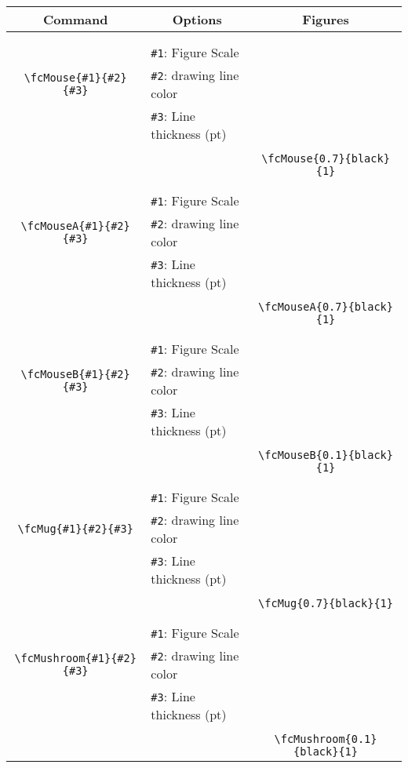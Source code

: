 \documentclass[x11names]{article}
\begin{document}
\begin{table}[H]\centering\begin{tabular}{|c|l|c|}\hline {\bf Command}& \multicolumn{1}{c|}{{\bf Options}} & {\bf Figures}\\  \hline	&&\multirow{5}{*}{\fcMouse{0.7}{black}{1}}\\	&&\\	&\verb|#1|: Figure Scale &\\	\verb|\fcMouse{#1}{#2}{#3}|&	\verb|#2|: drawing line color &\\	&\verb|#3|: Line thickness (pt) &\\ &&\\&&	\verb|\fcMouse{0.7}{black}{1}|\\\hline 	
	&&\multirow{5}{*}{\fcMouseA{0.7}{black}{1}}\\	&&\\	&\verb|#1|: Figure Scale &\\	\verb|\fcMouseA{#1}{#2}{#3}|&	\verb|#2|: drawing line color &\\	&\verb|#3|: Line thickness (pt) &\\ &&\\&&	\verb|\fcMouseA{0.7}{black}{1}|\\\hline 	
	&&\multirow{5}{*}{\fcMouseB{0.1}{black}{1}}\\	&&\\	&\verb|#1|: Figure Scale &\\	\verb|\fcMouseB{#1}{#2}{#3}|&	\verb|#2|: drawing line color &\\	&\verb|#3|: Line thickness (pt) &\\ &&\\&&	\verb|\fcMouseB{0.1}{black}{1}|\\\hline 	
	&&\multirow{5}{*}{\fcMug{0.7}{black}{1}}\\	&&\\	&\verb|#1|: Figure Scale &\\	\verb|\fcMug{#1}{#2}{#3}|&	\verb|#2|: drawing line color &\\	&\verb|#3|: Line thickness (pt) &\\ &&\\&&	\verb|\fcMug{0.7}{black}{1}|\\\hline 	
	&&\multirow{5}{*}{\fcMushroom{0.1}{black}{1}}\\	&&\\	&\verb|#1|: Figure Scale &\\	\verb|\fcMushroom{#1}{#2}{#3}|&	\verb|#2|: drawing line color &\\	&\verb|#3|: Line thickness (pt) &\\ &&\\&&	\verb|\fcMushroom{0.1}{black}{1}|\\\hline 	

\end{tabular}
\end{table}
\end{document}
